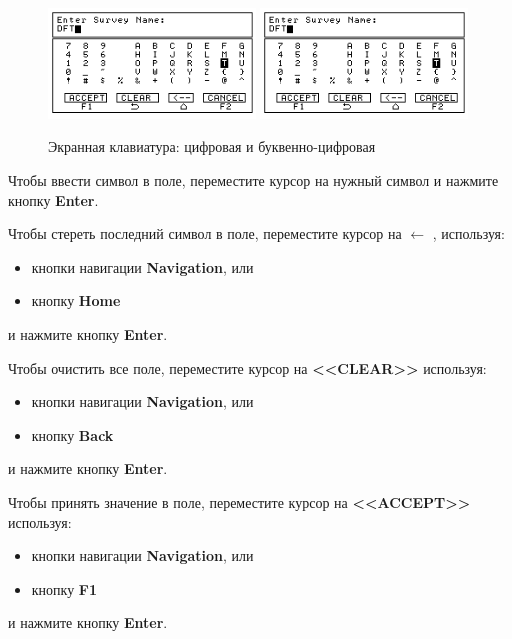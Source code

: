 \begin{figure}[h]
  \centering
  \includegraphics[width=0.49\textwidth]{figures/onscreen_keypad_numeric_and_alphanumeric_1}
  \includegraphics[width=0.49\textwidth]{figures/onscreen_keypad_numeric_and_alphanumeric_2}
  \caption{Экранная клавиатура: цифровая и буквенно-цифровая}
  \label{fig:onscreen_keypad_numeric_and_alphanumeric}
\end{figure}

Чтобы ввести символ в поле, переместите курсор на нужный символ и нажмите кнопку
\textbf{Enter}.

Чтобы стереть последний символ в поле, переместите курсор на $\leftarrow$ , используя:
\begin{itemize}
  \item кнопки навигации \textbf{Navigation}, или
  \item кнопку \textbf{Home}
\end{itemize}
и нажмите кнопку \textbf{Enter}.

Чтобы очистить все поле, переместите курсор на \textbf{<<CLEAR>>} используя:
\begin{itemize}
  \item кнопки навигации \textbf{Navigation}, или
  \item кнопку \textbf{Back}
\end{itemize}
и нажмите кнопку \textbf{Enter}.

Чтобы принять значение в поле, переместите курсор на \textbf{<<ACCEPT>>} используя:
\begin{itemize}
  \item кнопки навигации \textbf{Navigation}, или
  \item кнопку \textbf{F1}
\end{itemize}
и нажмите кнопку \textbf{Enter}.

